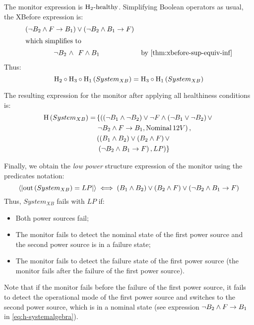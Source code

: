 \begin{sloppypar}
The monitor expression is $\healthy[2]$. 
Simplifying Boolean operators as usual, the XBefore expression is:
%
\begin{align*}
  \left(\lnot B_2 \land \xbefore{F}{B_1}\right) &\lor \left(\lnot B_2 \land \xbefore{B_1}{F}\right)\\
  \intertext{which simplifies to}
  \lnot B_2 ~\land ~&~ F \land B_1 & \text{by \cref{thm:xbefore-sup-equiv-inf}}
\end{align*}
%
Thus:
\[
\healthiness[2] \circ \healthiness[3] \circ \healthiness[1]\left(System_{XB}\right) =
\healthiness[3] \circ \healthiness[1]  \left(System_{XB}\right)
\]
  
\end{sloppypar}

The resulting expression for the monitor after applying all healthiness conditions is:
\begin{equation}
\label{eq:h-systemalgebra}
\begin{split}
  \mathrm{H}\left(System_{XB}\right) = & \left\{
    \left(\left(\lnot B_1 \land \lnot B_2\right) \lor 
      \lnot F \land \left(\lnot B_1 \lor \lnot B_2\right) \lor \right.\right.\\
  & \left. \lnot B_2 \land F \rightarrow B_1, \mathop{\mathrm{Nominal}} 12V\right), \\
  & \left(\left(B_1 \land B_2\right) \lor \left(B_2 \land F\right) \lor \right.\\
  & \left.\left. \left(\lnot B_2 \land B_1 \rightarrow F\right), 
      LP\right)
  \right\}
\end{split}
\end{equation}

Finally, we obtain the \emph{low power} structure expression of the monitor using the predicates notation:
\[
\left\langle\left| \mathrm{out}\left(System_{XB}\right) = LP \right|\right\rangle \iff 
  \left(B_1 \land B_2\right) \lor 
  \left(B_2 \land F\right) \lor
  \left(\lnot B_2 \land B_1 \rightarrow F\right)
\]
%
Thus, $System_{XB}$ fails with $LP$ if:
\begin{itemize}
  \item Both power sources fail;
  \item The monitor fails to detect the nominal state of the first power source and the second power source is in a failure state;
  \item The monitor fails to detect the failure state of the first power source (the monitor fails after the failure of the first power source).
\end{itemize}
%
Note that if the monitor fails before the failure of the first power source, it fails to detect the operational mode of the first power source and switches to the second power source, which is in a nominal state (see expression $\lnot B_2 \land F \rightarrow B_1$ in \cref{eq:h-systemalgebra}).

